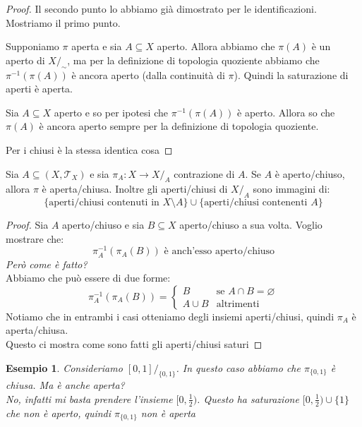 \documentclass[11pt,a4paper,twoside]{article}
\newtheorem{es}{Esempio}
\theoremstyle{definition}
\begin{document}
\begin{proof}
	Il secondo punto lo abbiamo già dimostrato per le identificazioni. Mostriamo il primo punto.

	\fbox{$\Rightarrow$} Supponiamo $\pi$ aperta e sia $A\subseteq X$ aperto. Allora abbiamo che $\pi(A)$ è un aperto di $X/_\sim$, ma per la definizione di topologia quoziente abbiamo che $\pi^{-1}(\pi(A))$ è ancora aperto (dalla continuità di $\pi$). Quindi la saturazione di aperti è aperta.

	\fbox{$\Leftarrow$} Sia $A \subseteq X$ aperto e so per ipotesi che $\pi^{-1}(\pi(A))$ è aperto. Allora so che $\pi(A)$ è ancora aperto sempre per la definizione di topologia quoziente.

	Per i chiusi è la stessa identica cosa
\end{proof}

\begin{cor}{}{}
	Sia $A \subseteq (X, \mathcal T_X)$ e sia $\pi_A:X \to X/_A$ contrazione di $A$. Se $A$ è aperto/chiuso, allora $\pi$ è aperta/chiusa. Inoltre gli aperti/chiusi di $X/_A$ sono immagini di:
	\[ \{\text{aperti/chiusi contenuti in }X\setminus A\} \cup \{\text{aperti/chiusi contenenti }A\}\]
\end{cor}

\begin{proof}
	Sia $A$ aperto/chiuso e sia $B\subseteq X$ aperto/chiuso a sua volta. Voglio mostrare che:
	\[ \pi_A^{-1}(\pi_A(B)) \text{ è anch'esso aperto/chiuso}\]
	\textit{Però come è fatto?}\\
	Abbiamo che può essere di due forme:
	\[
		\pi^{-1}_A(\pi_A(B)) = \begin{cases}
			B & \text{se }A\cap B = \varnothing\\
			A \cup B & \text{altrimenti}
		\end{cases}
	\]
	Notiamo che in entrambi i casi otteniamo degli insiemi aperti/chiusi, quindi $\pi_A$ è aperta/chiusa.\\
	Questo ci mostra come sono fatti gli aperti/chiusi saturi
\end{proof}

\begin{es}
	Consideriamo $[0,1]/_{\{0,1\}}$. In questo caso abbiamo che $\pi_{\{0,1\}}$ è chiusa. Ma è anche aperta?\\
	No, infatti mi basta prendere l'insieme $[0,\frac 12)$. Questo ha saturazione $[0, \frac 12) \cup \{1\}$ che non è aperto, quindi $\pi_{\{0,1\}}$ non è aperta
\end{es}
\end{document}
